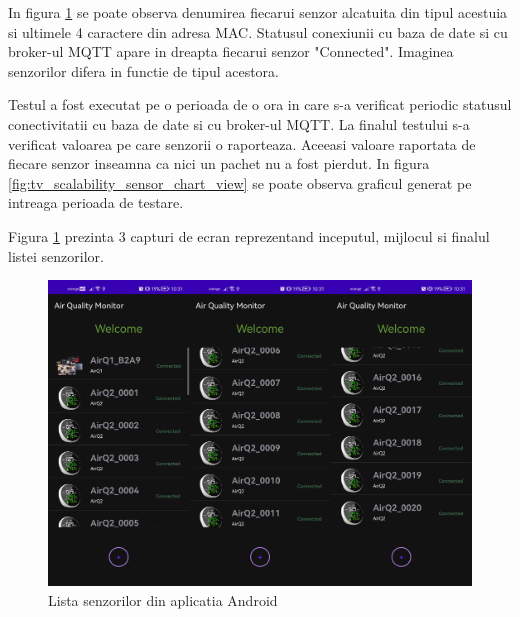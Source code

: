 In figura \ref{fig:tv_scalability_welcome_view} se poate observa denumirea fiecarui senzor alcatuita din tipul acestuia si ultimele 4 caractere din adresa MAC. Statusul 
conexiunii cu baza de date si cu broker-ul MQTT apare in dreapta fiecarui senzor "Connected". Imaginea senzorilor difera in functie de tipul acestora. 

Testul a fost executat pe o perioada de o ora in care s-a verificat periodic statusul conectivitatii cu baza de date si cu broker-ul MQTT. La finalul testului 
s-a verificat valoarea pe care senzorii o raporteaza. Aceeasi valoare raportata de fiecare senzor inseamna ca nici un pachet nu a fost pierdut. In figura 
\ref{fig:tv_scalability_sensor_chart_view} se poate observa graficul generat pe intreaga perioada de testare.

Figura \ref{fig:tv_scalability_welcome_view} prezinta 3 capturi de ecran reprezentand inceputul, mijlocul si finalul listei senzorilor.
\begin{figure}[H]
    \centering
    \includegraphics[scale=0.16]{figs/tv_scalability_welcome_view.png}
    \caption{Lista senzorilor din aplicatia Android}
    \label{fig:tv_scalability_welcome_view}
\end{figure}

